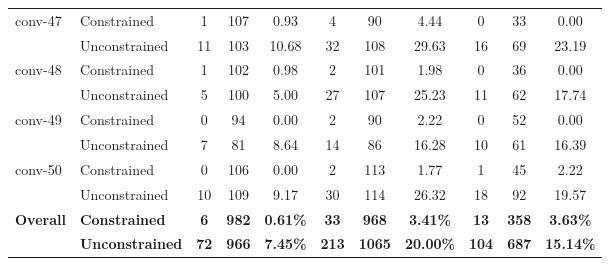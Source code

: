 \begin{table}[t]
{\begin{tabular}{ll|ccc|ccc|ccc}
\midrule
\multirow{2}{*}{conv-47} & Constrained & 1 & 107 & 0.93 & 4 & 90 & 4.44 & 0 & 33 & 0.00 \\
& Unconstrained & 11 & 103 & 10.68 & 32 & 108 & 29.63 & 16 & 69 & 23.19 \\
\midrule
\multirow{2}{*}{conv-48} & Constrained & 1 & 102 & 0.98 & 2 & 101 & 1.98 & 0 & 36 & 0.00 \\
& Unconstrained & 5 & 100 & 5.00 & 27 & 107 & 25.23 & 11 & 62 & 17.74 \\
\midrule
\multirow{2}{*}{conv-49} & Constrained & 0 & 94 & 0.00 & 2 & 90 & 2.22 & 0 & 52 & 0.00 \\
& Unconstrained & 7 & 81 & 8.64 & 14 & 86 & 16.28 & 10 & 61 & 16.39 \\
\midrule
\multirow{2}{*}{conv-50} & Constrained & 0 & 106 & 0.00 & 2 & 113 & 1.77 & 1 & 45 & 2.22 \\
& Unconstrained & 10 & 109 & 9.17 & 30 & 114 & 26.32 & 18 & 92 & 19.57 \\
\midrule
\midrule
\multirow{2}{*}{\textbf{Overall}} & \textbf{Constrained} & \textbf{6} & \textbf{982} & \textbf{0.61\%} & \textbf{33} & \textbf{968} & \textbf{3.41\%} & \textbf{13} & \textbf{358} & \textbf{3.63\%} \\
& \textbf{Unconstrained} & \textbf{72} & \textbf{966} & \textbf{7.45\%} & \textbf{213} & \textbf{1065} & \textbf{20.00\%} & \textbf{104} & \textbf{687} & \textbf{15.14\%} \\
\bottomrule
\end{tabular}
}
\end{table}